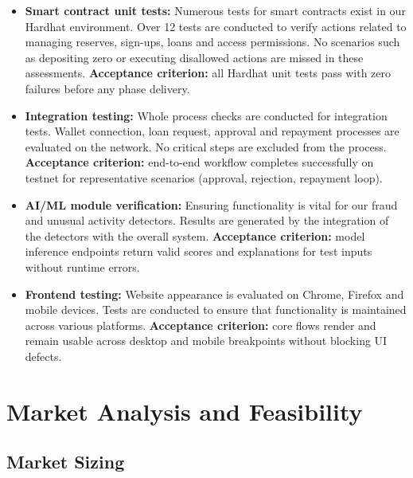 \documentclass[12pt,a4paper]{report}
\begin{document}
\begin{itemize}[noitemsep]
\item \textbf{Smart contract unit tests:} Numerous tests for smart contracts exist in our Hardhat environment. Over 12 tests are conducted to verify actions related to managing reserves, sign-ups, loans and access permissions. No scenarios such as depositing zero or executing disallowed actions are missed in these assessments. \textbf{Acceptance criterion:} all Hardhat unit tests pass with zero failures before any phase delivery.
\item \textbf{Integration testing:} Whole process checks are conducted for integration tests. Wallet connection, loan request, approval and repayment processes are evaluated on the network. No critical steps are excluded from the process. \textbf{Acceptance criterion:} end-to-end workflow completes successfully on testnet for representative scenarios (approval, rejection, repayment loop).
\item \textbf{AI/ML module verification:} Ensuring functionality is vital for our fraud and unusual activity detectors. Results are generated by the integration of the detectors with the overall system. \textbf{Acceptance criterion:} model inference endpoints return valid scores and explanations for test inputs without runtime errors.
\item \textbf{Frontend testing:} Website appearance is evaluated on Chrome, Firefox and mobile devices. Tests are conducted to ensure that functionality is maintained across various platforms. \textbf{Acceptance criterion:} core flows render and remain usable across desktop and mobile breakpoints without blocking UI defects.
\end{itemize}


\chapter{Market Analysis and Feasibility}

\section{Market Sizing}
\end{document}
